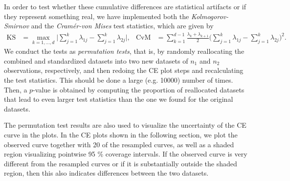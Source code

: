 \documentclass[titlepage,11pt,twoside]{article}
\begin{document}
In order to test whether these cumulative differences are statistical artifacts or if they represent something real, we have implemented both the \emph{Kolmogorov-Smirnov} and the \emph{Cram\'er-von Mises} test statistics, which are given by
\begin{align*}
\text{KS} &= \max_{k=1,\dotsc,d} \bigg\lvert \sum_{j=1}^k \lambda_{1j} - \sum_{j=1}^k \lambda_{2j} \bigg\rvert, &
\text{CvM} &= \sum_{k=1}^{d-1} \frac{\lambda_k + \lambda_{k+1}}{2} \bigg( \sum_{j=1}^k \lambda_{1j} - \sum_{j=1}^k \lambda_{2j} \bigg)^2.
\end{align*}
We conduct the tests as \textit{permutation tests}, that is, by randomly reallocating the combined and standardized datasets into two new datasets of $n_1$ and $n_2$ observations, respectively, and then redoing the CE plot steps and recalculating the test statistics. This should be done a large (e.g. 10000) number of times. Then, a $p$-value is obtained by computing the proportion of reallocated datasets that lead to even larger test statistics than the one we found for the original datasets.

The permutation test results are also used to visualize the uncertainty of the CE curve in the plots. In the CE plots shown in the following section, we plot the observed curve together with 20 of the resampled curves, as well as a shaded region visualizing pointwise 95 \% coverage intervals. If the observed curve is very different from the resampled curves or if it is substantially outside the shaded region, then this also indicates differences between the two datasets.

\end{document}
